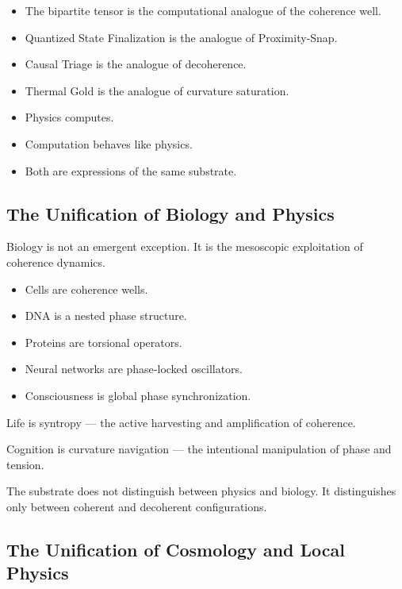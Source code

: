 \documentclass[reprint,amsmath,amssymb,aps,prl,floatfix]{revtex4-2}
\begin{document}
\begin{itemize}
\begin{itemize}
\item The bipartite tensor is the computational analogue of the coherence well.  
\item Quantized State Finalization is the analogue of Proximity‑Snap.  
\item Causal Triage is the analogue of decoherence.  
\item Thermal Gold is the analogue of curvature saturation.  
\end{itemize}
\medskip
\begin{itemize}
\item Physics computes.  
\item Computation behaves like physics.  
\item Both are expressions of the same substrate.
\end{itemize}

\subsection{The Unification of Biology and Physics}

Biology is not an emergent exception.  
It is the mesoscopic exploitation of coherence dynamics.

\begin{itemize}
\item Cells are coherence wells.  
\item DNA is a nested phase structure.  
\item Proteins are torsional operators.  
\item Neural networks are phase‑locked oscillators.  
\item Consciousness is global phase synchronization.  
\end{itemize}

Life is syntropy — the active harvesting and amplification of coherence.
\medskip

Cognition is curvature navigation — the intentional manipulation of phase and tension.
\medskip

The substrate does not distinguish between physics and biology.  
It distinguishes only between coherent and decoherent configurations.

\subsection{The Unification of Cosmology and Local Physics}


\end{itemize}
\end{document}
